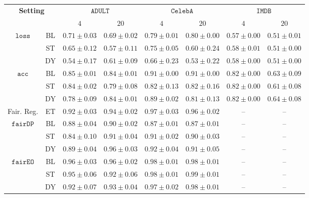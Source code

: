 \begin{tabular}{cc||cc|cc|cc|}
    \multicolumn{2}{c||}{\multirow{2}{*}{\textbf{Setting}}}
    & \multicolumn{2}{c|}{\textbf{$\mathtt{ADULT}$}}
    & \multicolumn{2}{c|}{\textbf{$\mathtt{CelebA}$}}
    & \multicolumn{2}{c|}{\textbf{$\mathtt{IMDB}$}} \\
    && $4$ & $20$ & $4$ & $20$ & $4$ & $20$ \\
    \hline\hline
    \multirow{3}{*}{$\mathtt{loss}$}
    & BL & $0.71 \pm 0.03$ & $0.69 \pm 0.02$ & $0.79 \pm 0.01$ & $0.80 \pm 0.00$ & $0.57 \pm 0.00$ & $0.51 \pm 0.01$ \\
    & ST & $0.65 \pm 0.12$ & $0.57 \pm 0.11$ & $0.75 \pm 0.05$ & $0.60 \pm 0.24$ & $0.58 \pm 0.01$ & $0.51 \pm 0.00$ \\
    & DY & $0.54 \pm 0.17$ & $0.61 \pm 0.09$ & $0.66 \pm 0.23$ & $0.53 \pm 0.22$ & $0.58 \pm 0.00$ & $0.51 \pm 0.00$ \\
    \hline
    \multirow{3}{*}{$\mathtt{acc}$}
    & BL & $0.85 \pm 0.01$ & $0.84 \pm 0.01$ & $0.91 \pm 0.00$ & $0.91 \pm 0.00$ & $0.82 \pm 0.00$ & $0.63 \pm 0.09$ \\
    & ST & $0.84 \pm 0.02$ & $0.79 \pm 0.08$ & $0.82 \pm 0.13$ & $0.82 \pm 0.16$ & $0.82 \pm 0.00$ & $0.61 \pm 0.08$ \\
    & DY & $0.78 \pm 0.09$ & $0.84 \pm 0.01$ & $0.89 \pm 0.02$ & $0.81 \pm 0.13$ & $0.82 \pm 0.00$ & $0.64 \pm 0.08$ \\
    \hline\hline
    Fair. Reg.& ET & $0.92 \pm 0.03$ & $0.94 \pm 0.02$ & $0.97 \pm 0.03$ & $0.96 \pm 0.02$ & -- & -- \\
    \hline
    \multirow{3}{*}{$\mathtt{fairDP}$}
    & BL & $0.88 \pm 0.04$ & $0.90 \pm 0.02$ & $0.87 \pm 0.01$ & $0.87 \pm 0.01$ & -- & -- \\
    & ST & $0.84 \pm 0.10$ & $0.91 \pm 0.04$ & $0.91 \pm 0.02$ & $0.90 \pm 0.03$ & -- & -- \\
    & DY & $0.89 \pm 0.04$ & $0.96 \pm 0.03$ & $0.92 \pm 0.04$ & $0.91 \pm 0.05$ & -- & -- \\
    \hline
    \multirow{3}{*}{$\mathtt{fairEO}$}
    & BL & $0.96 \pm 0.03$ & $0.96 \pm 0.02$ & $0.98 \pm 0.01$ & $0.98 \pm 0.01$ & -- & -- \\
    & ST & $0.95 \pm 0.06$ & $0.92 \pm 0.06$ & $0.98 \pm 0.01$ & $0.99 \pm 0.01$ & -- & -- \\
    & DY & $0.92 \pm 0.07$ & $0.93 \pm 0.04$ & $0.97 \pm 0.02$ & $0.98 \pm 0.01$ & -- & -- \\

\end{tabular}
